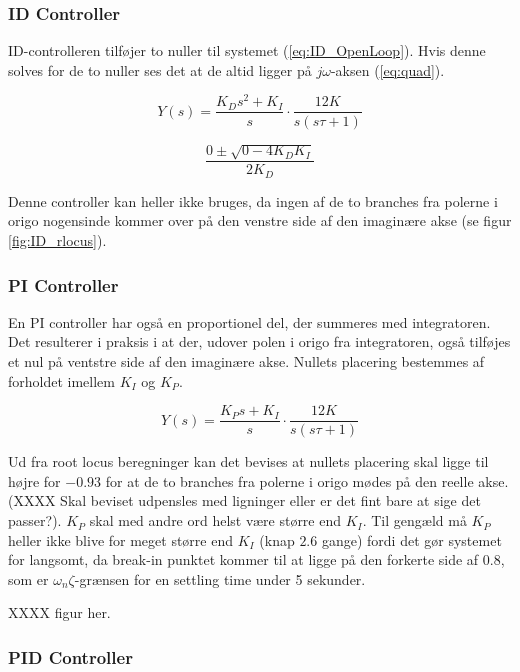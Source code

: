 \subsubsection{ID Controller}

ID-controlleren tilføjer to nuller til systemet (\ref{eq:ID_OpenLoop}). Hvis denne solves for de to nuller ses det at de altid ligger på $j\omega$-aksen (\ref{eq:quad}).

\begin{equation}\label{eq:ID_OpenLoop}
Y(s)=\frac{K_{D}s^2+K_{I}}{s}\cdot\frac{12K}{s(s\tau+1)}
\end{equation}

\begin{equation}\label{eq:quad}
\dfrac{0\pm\sqrt{0-4K_{D}K_{I}}}{2K_{D}}
\end{equation}

Denne controller kan heller ikke bruges, da ingen af de to branches fra polerne i origo nogensinde kommer over på den venstre side af den imaginære akse (se figur \ref{fig:ID_rlocus}).

\subsubsection{PI Controller}

En PI controller har også en proportionel del, der summeres med integratoren. Det resulterer i praksis i at der, udover polen i origo fra integratoren, også tilføjes et nul på ventstre side af den imaginære akse. Nullets placering bestemmes af forholdet imellem $K_{I}$ og $K_{P}$.

\begin{equation}\label{eq:PI_OpenLoop}
Y(s)=\frac{K_{P}s+K_{I}}{s}\cdot\frac{12K}{s(s\tau+1)}
\end{equation}

Ud fra root locus beregninger kan det bevises at nullets placering skal ligge til højre for $-0.93$ for at de to branches fra polerne i origo mødes på den reelle akse. (XXXX Skal beviset udpensles med ligninger eller er det fint bare at sige det passer?). $K_{P}$ skal med andre ord helst være større end $K_{I}$. Til gengæld må $K_{P}$ heller ikke blive for meget større end $K_{I}$ (knap $2.6$ gange) fordi det gør systemet for langsomt, da break-in punktet kommer til at ligge på den forkerte side af $0.8$, som er $\omega_{n}\zeta$-grænsen for en settling time under 5 sekunder. 

XXXX figur her.


\subsubsection{PID Controller}


